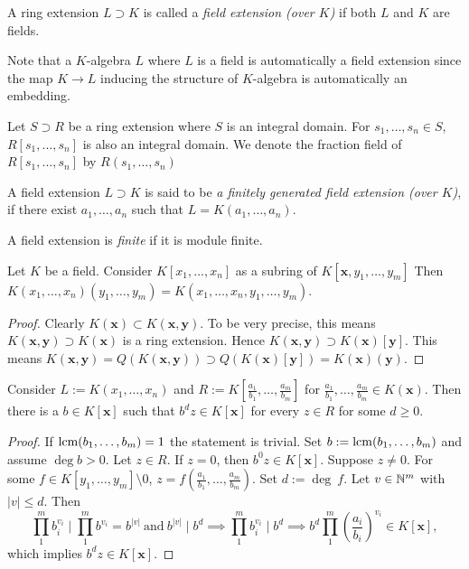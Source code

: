 \begin{definition}
    A ring extension $L\supset K$ is called a \textit{field extension (over $K$)} if both $L$ and $K$ are fields.
\end{definition}
\begin{remark}
    Note that a $K$-algebra $L$ where $L$ is a field is automatically a field extension since the map $K\rightarrow L$ inducing the structure of $K$-algebra is automatically an embedding. 
\end{remark}
Let $S\supset R$ be a ring extension where $S$ is an integral domain. For $s_1,\dots,s_n\in S$, $R[s_1,\dots,s_n]$ is also an integral domain. We denote the fraction field of $R[s_1,\dots,s_n]$ by $R(s_1,\dots,s_n)$
\begin{definition}
    A field extension $L\supset K$ is said to be \textit{a finitely generated field extension (over $K$)}, if there exist $a_1,\dots,a_n$ such that $L = K(a_1,\dots,a_n)$.
\end{definition}
\begin{definition}
    A field extension is \emph{finite} if it is module finite. 
\end{definition}
\begin{lemma}
    Let $K$ be a field. Consider $K[x_1,\dots,x_n]$ as a subring of $K[\mathbf{x},y_1,\dots,y_m]$ Then $K(x_1,\dots,x_n)(y_1,\dots,y_m) = K(x_1,\dots,x_n,y_1,\dots,y_m).$
\end{lemma}
\begin{proof}
    Clearly $K(\mathbf{x})\subset K(\mathbf{x},\mathbf{y})$.  To be very precise, this means $K(\mathbf{x},\mathbf{y})\supset K(\mathbf{x})$ is a ring extension. Hence $K(\mathbf{x},\mathbf{y})\supset K(\mathbf{x})[\mathbf{y}]$. This means
    $K(\mathbf{x},\mathbf{y})= Q(K(\mathbf{x},\mathbf{y}))\supset Q(K(\mathbf{x})[\mathbf{y}])=K(\mathbf{x})(\mathbf{y})$.
\end{proof}
\begin{lemma}\label{CriterionForCheckingMembershipInAlgebra}
    Consider $L := K(x_1,\dots,x_n)$ and $R:= K\left[\frac{a_1}{b_1},\dots,\frac{a_m}{b_m}\right]$ for $\frac{a_1}{b_1},\dots,\frac{a_m}{b_m}\in K(\mathbf{x})$. Then there is a $b\in K[\mathbf{x}]$ such that $b^dz\in K[\mathbf{x}]$ for every $z\in R$ for some $d\geq 0$.
\end{lemma}
\begin{proof}
    If $\mathrm{lcm}(b_1,\dots,b_m)=1$ the statement is trivial. Set $b := \mathrm{lcm}(b_1,\dots,b_m)$ and assume $\deg b > 0$. Let $z\in R$. If $z=0$, then $b^0z\in K[\mathbf{x}]$. Suppose $z\neq 0$. For some $f\in K[y_1,\dots,y_m]\setminus 0$, $z = f\left(\frac{a_1}{b_1},\dots,\frac{a_m}{b_m}\right)$. Set $d := \deg \ f$. Let $v\in \mathbb{N}^m$ with $\vert v \vert \leq d$. Then 
    $$\prod_1^m b_i^{v_i}\mid \prod_1^m b^{v_i}= b^{\vert v\vert } \ \mathrm{and}\ b^{\vert v\vert} \mid b^d \implies \prod_1^m b_i^{v_i}\mid b^d \implies b^d\prod_1^m \left(\frac{a_i}{b_i}\right)^{v_i} \in K[\mathbf{x}],$$
    which implies $ b^dz\in K[\mathbf{x}].$
\end{proof}
